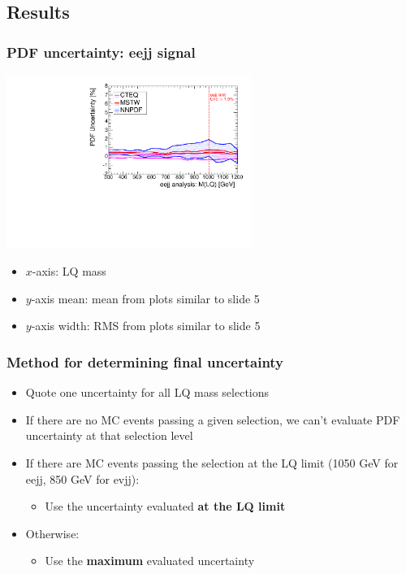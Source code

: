 \documentclass[bigger]{beamer}
\providecommand{\alert}[1]{\textbf{#1}}
\begin{document}
\subsection{Results}
\label{sec-3-1}
\begin{frame}
\frametitle{PDF uncertainty: eejj signal}
\label{sec-3-1-1}
\label{sec-3-1-1-1}

\centering
\includegraphics[width=0.6\textwidth]{fig/eejj_envelope.pdf}
\label{sec-3-1-1-2}

\centering
\begin{itemize}

\item $x$-axis: LQ mass
\label{sec-3-1-1-2-1}%

\item $y$-axis mean: mean from plots similar to slide 5
\label{sec-3-1-1-2-2}%

\item $y$-axis width: RMS from plots similar to slide 5
\label{sec-3-1-1-2-3}%

\end{itemize} %
\end{frame}
\begin{frame}
\frametitle{Method for determining final uncertainty}
\label{sec-3-1-2}
\begin{itemize}

\item Quote one uncertainty for all LQ mass selections
\label{sec-3-1-2-1}%

\item If there are no MC events passing a given selection, we can't evaluate PDF uncertainty at that selection level
\label{sec-3-1-2-2}%

\item If there are MC events passing the selection at the LQ limit (1050 GeV for eejj, 850 GeV for evjj):
\label{sec-3-1-2-3}%
\begin{itemize}

\item Use the uncertainty evaluated \alert{at the LQ limit}
\label{sec-3-1-2-3-1}%
\end{itemize} %

\item Otherwise:
\label{sec-3-1-2-4}%
\begin{itemize}

\item Use the \alert{maximum} evaluated uncertainty
\label{sec-3-1-2-4-1}%
\end{itemize} %
\end{itemize} %
\end{frame}
\end{document}
